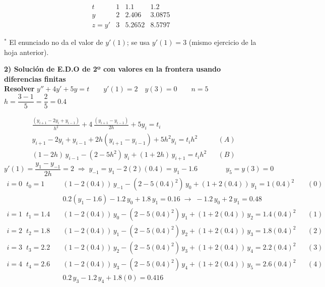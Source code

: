\documentclass[11pt]{article}
\begin{document}
\vspace{-6pt}\[ \boxed{\begin{array}{c|ccc} t & 1 & 1.1 & 1.2\\\hline y & 2 & 2.406 & 3.0875\\ z=y' & 3 & 5.2652 & 8.5797\end{array}} \]

{\footnotesize $^{*}$ El enunciado no da el valor de $y'(1)$; se usa $y'(1)=3$ (mismo ejercicio de la hoja anterior).}
\newpage

{\large\textbf{2) Solución de E.D.O de 2º con valores en la frontera usando diferencias finitas}}\\[6pt]
\textbf{Resolver} \quad $y''+4y'+5y=t \qquad y'(1)=2 \quad y(3)=0 \qquad n=5$\\[4pt]
$h=\dfrac{3-1}{5}=\dfrac{2}{5}=0.4$ \hfill
{}
\begin{align*}
&\frac{(y_{i+1}-2y_i+y_{i-1})}{h^2}+4\,\frac{(y_{i+1}-y_{i-1})}{2h}+5y_i=t_i\\[4pt]
&y_{i+1}-2y_i+y_{i-1}+2h(y_{i+1}-y_{i-1})+5h^2y_i=t_ih^2 && (A)\\[4pt]
&(1-2h)\,y_{i-1}-(2-5h^2)\,y_i+(1+2h)\,y_{i+1}=t_ih^2 && (B)
\end{align*}
$y'(1)=\dfrac{y_1-y_{-1}}{2h}=2 \;\Rightarrow\; y_{-1}=y_1-2(2)(0.4)=y_1-1.6 \qquad\qquad y_5=y(3)=0$
\begin{align*}
i=0 \;\; t_0=1 &\quad (1-2(0.4))\,y_{-1}-(2-5(0.4)^2)\,y_0+(1+2(0.4))\,y_1=1(0.4)^2 && (0)\\
&\quad 0.2(y_1-1.6)-1.2\,y_0+1.8\,y_1=0.16 \;\to\; -1.2\,y_0+2\,y_1=0.48\\
i=1 \;\; t_1=1.4 &\quad (1-2(0.4))\,y_0-(2-5(0.4)^2)\,y_1+(1+2(0.4))\,y_2=1.4(0.4)^2 && (1)\\
i=2 \;\; t_2=1.8 &\quad (1-2(0.4))\,y_1-(2-5(0.4)^2)\,y_2+(1+2(0.4))\,y_3=1.8(0.4)^2 && (2)\\
i=3 \;\; t_3=2.2 &\quad (1-2(0.4))\,y_2-(2-5(0.4)^2)\,y_3+(1+2(0.4))\,y_4=2.2(0.4)^2 && (3)\\
i=4 \;\; t_4=2.6 &\quad (1-2(0.4))\,y_3-(2-5(0.4)^2)\,y_4+(1+2(0.4))\,y_5=2.6(0.4)^2 && (4)\\
&\quad 0.2\,y_3-1.2\,y_4+1.8(0)=0.416
\end{align*}
\end{document}
